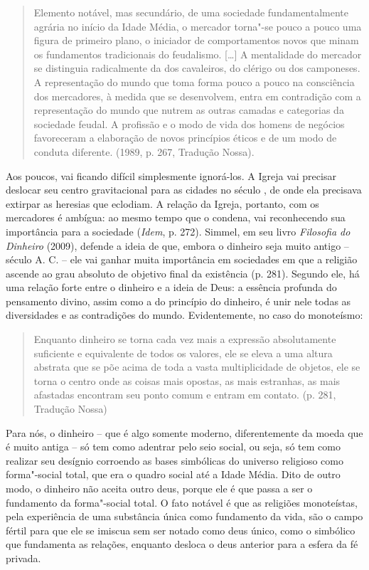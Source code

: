 \begin{quote}
Elemento notável, mas secundário, de uma sociedade fundamentalmente
agrária no início da Idade Média, o mercador torna"-se pouco a pouco uma
figura de primeiro plano, o iniciador de comportamentos novos que minam
os fundamentos tradicionais do feudalismo. [\ldots{}] A mentalidade
do mercador se distinguia radicalmente da dos cavaleiros, do clérigo ou
dos camponeses. A representação do mundo que toma forma pouco a pouco na
consciência dos mercadores, à medida que se desenvolvem, entra em
contradição com a representação do mundo que nutrem as outras camadas e
categorias da sociedade feudal. A profissão e o modo de vida dos homens
de negócios favoreceram a elaboração de novos princípios éticos e de um
modo de conduta diferente. (1989, p. 267, Tradução Nossa).
\end{quote}

Aos poucos, vai ficando difícil simplesmente ignorá-los. A Igreja vai
precisar deslocar seu centro gravitacional para as cidades no século
, de onde ela precisava extirpar as heresias que eclodiam. A relação
da Igreja, portanto, com os mercadores é ambígua: ao mesmo tempo que o
condena, vai reconhecendo sua importância para a sociedade (\emph{Idem},
p. 272). Simmel, em seu livro \emph{Filosofia do Dinheiro} (2009),
defende a ideia de que, embora o dinheiro seja muito antigo -- século
 A. C. -- ele vai ganhar muita importância em sociedades em que a
religião ascende ao grau absoluto de objetivo final da existência (p.
281). Segundo ele, há uma relação forte entre o dinheiro e a ideia de
Deus: a essência profunda do pensamento divino, assim como a do
princípio do dinheiro, é unir nele todas as diversidades e as
contradições do mundo. Evidentemente, no caso do monoteísmo:

\begin{quote}
Enquanto dinheiro se torna cada vez mais a expressão absolutamente
suficiente e equivalente de todos os valores, ele se eleva a uma altura
abstrata que se põe acima de toda a vasta multiplicidade de objetos, ele
se torna o centro onde as coisas mais opostas, as mais estranhas, as
mais afastadas encontram seu ponto comum e entram em contato. (p. 281,
Tradução Nossa)
\end{quote}

Para nós, o dinheiro -- que é algo somente moderno, diferentemente da
moeda que é muito antiga -- só tem como adentrar pelo seio social, ou
seja, só tem como realizar seu desígnio corroendo as bases simbólicas do
universo religioso como forma"-social total, que era o quadro social até
a Idade Média. Dito de outro modo, o dinheiro não aceita outro deus,
porque ele é que passa a ser o fundamento da forma"-social total. O fato
notável é que as religiões monoteístas, pela experiência de uma
substância única como fundamento da vida, são o campo fértil para que
ele se imiscua sem ser notado como deus único, como o simbólico que
fundamenta as relações, enquanto desloca o deus anterior para a esfera
da fé privada.

